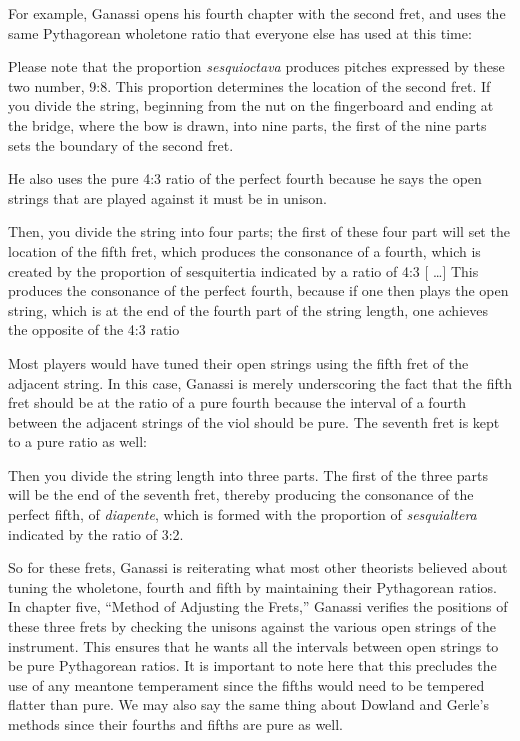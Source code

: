 For example, Ganassi opens his fourth chapter with the second fret, and uses the same
Pythagorean wholetone ratio that everyone else has used at this time:
\begin{blocks}
Please note that the proportion \emph{sesquioctava} produces pitches expressed
by these two number, 9:8.  This proportion determines the location of the second
fret.  If you divide the string, beginning from the nut on the fingerboard and
ending at the bridge, where the bow is drawn, into nine parts, the first of the
nine parts sets the boundary of the second fret.
\end{blocks}
He also uses the pure 4:3 ratio of the
perfect fourth because he says the open strings that are played against it must
be in unison.
\begin{blocks}
Then, you divide the string into four parts; the first of these four part will
set the location of the fifth fret, which produces the consonance of a fourth,
which is created by the proportion of sesquitertia indicated by a ratio of 4:3
[ \ldots ] This produces the consonance of the perfect fourth, because if
one then plays the open string, which is at the end of the fourth part of the
string length, one achieves the opposite of the 4:3 ratio
\end{blocks}
Most players would have tuned their open strings using the fifth fret of the
adjacent string.  In this case, Ganassi is merely underscoring the fact that the fifth
fret should be at the ratio of a pure fourth because the interval of a fourth between
the adjacent strings of the viol should be pure. The seventh fret is kept to a pure
ratio as well:
\begin{blocks}
Then you divide the string length into three parts. The first of the three parts will
be the end of the seventh fret, thereby producing the consonance of the perfect fifth,
of \textit{diapente}, which is formed with the proportion of \textit{sesquialtera}
indicated by the ratio of 3:2.
\end{blocks}

So for these frets, Ganassi is reiterating what most other theorists believed about
tuning the wholetone, fourth and fifth by maintaining their Pythagorean ratios. In
chapter five, ``Method of Adjusting the Frets,'' Ganassi verifies the positions of
these three frets by checking the unisons against the various open strings of the
instrument.  This ensures that he wants all the intervals between open
strings to be pure Pythagorean ratios.  It is important to note here that this
precludes the use of any meantone temperament since the fifths would need to be
tempered flatter than pure.  We may also say the same thing about Dowland and Gerle's
methods since their fourths and fifths are pure as well.

